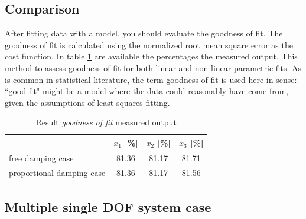 \subsection{Comparison}
\label{subsec:comparison}
After fitting data with a model, you should evaluate the goodness of fit. 
The goodness of fit is calculated using the normalized root mean square error 
as the cost function.
In table \ref{tab:goodoffit} are available the percentages the measured output.
This method to assess goodness of fit for both linear and non linear parametric 
fits.
As is common in statistical literature, the term goodness of fit is used here 
in sense: ``good fit" might be a model where the data could reasonably have 
come from, given the assumptions of least-squares fitting.
\begin{table}[ht]
\centering
\begin{tabular}{lccc}
	\toprule
		 & $x_1$ [\%] & $x_2$ [\%] & $x_3$ [\%]\\
	\midrule
	free damping case & 81.36 & 81.17 & 81.71 \\
	proportional damping case & 81.36 & 81.17 & 81.56 \\
	\bottomrule
\end{tabular}
\caption{Result \emph{goodness of fit} measured output}
\label{tab:goodoffit}
\end{table}
%
\newpage
\subsection{Multiple single DOF system case}
